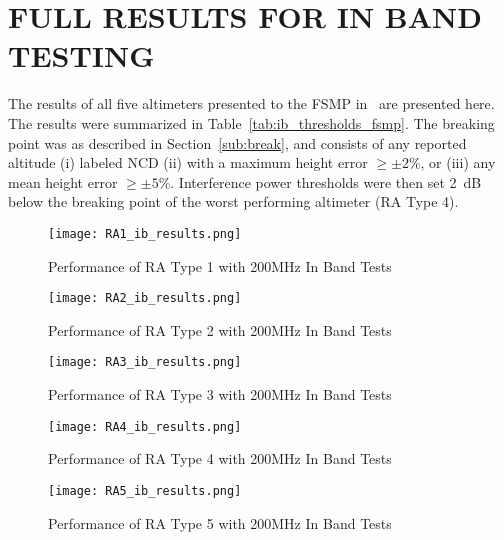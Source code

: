 %
%
%
%



\chapter{\uppercase{Full Results for In Band Testing}}\label{appendix_a}

The results of all five altimeters presented to the FSMP in~\cite{uwe_radio_2019} are presented here. The results were summarized in Table~\ref{tab:ib_thresholds_fsmp}. The breaking point was as described in Section~\ref{sub:break}, and consists of any reported altitude (i) labeled NCD (ii) with a maximum height error $\geq\pm2\%$, or (iii) any mean height error $\geq\pm5\%$. Interference power thresholds were then set 2~dB below the breaking point of the worst performing altimeter (RA Type 4). 
 \begin{figure}[h!]
	\centering
	\texttt{[image: RA1\_ib\_results.png]}
	\caption{Performance of RA Type 1 with 200MHz In Band Tests}
	\label{fig:RA1}
\end{figure}

 \begin{figure}[h!]
	\centering
	\texttt{[image: RA2\_ib\_results.png]}
	\caption{Performance of RA Type 2 with 200MHz In Band Tests}
	\label{fig:RA2}
\end{figure}

 \begin{figure}[h!]
	\centering
	\texttt{[image: RA3\_ib\_results.png]}
	\caption{Performance of RA Type 3 with 200MHz In Band Tests}
	\label{fig:RA3}
\end{figure}

 \begin{figure}[h!]
	\centering
	\texttt{[image: RA4\_ib\_results.png]}
	\caption{Performance of RA Type 4 with 200MHz In Band Tests}
	\label{fig:RA4_appendix}
\end{figure}

 \begin{figure}[h!]
	\centering
	\texttt{[image: RA5\_ib\_results.png]}
	\caption{Performance of RA Type 5 with 200MHz In Band Tests}
	\label{fig:RA5}
\end{figure}
